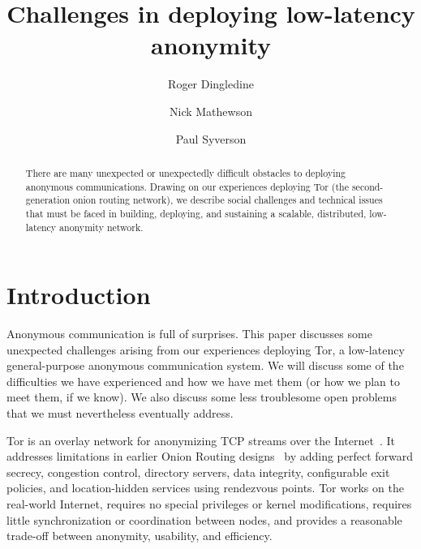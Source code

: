 \documentclass{llncs}
\begin{document}
\title{Challenges in deploying low-latency anonymity}

\author{Roger Dingledine \and
Nick Mathewson \and
Paul Syverson}

\maketitle
\pagestyle{plain}

\begin{abstract}
  There are many unexpected or unexpectedly difficult obstacles to
  deploying anonymous communications.  Drawing on our experiences deploying
  Tor (the second-generation onion routing network), we describe social
  challenges and technical issues that must be faced
  in building, deploying, and sustaining a scalable, distributed, low-latency
  anonymity network.
\end{abstract}

\section{Introduction}
Anonymous communication is full of surprises.  This paper discusses some
unexpected challenges arising from our experiences deploying Tor, a
low-latency general-purpose anonymous communication system.  We will discuss
some of the difficulties we have experienced and how we have met them (or how
we plan to meet them, if we know).  We also discuss some less
troublesome open problems that we must nevertheless eventually address.

Tor is an overlay network for anonymizing TCP streams over the
Internet~\cite{tor-design}.  It addresses limitations in earlier Onion
Routing designs~\cite{or-ih96,or-jsac98,or-discex00,or-pet00} by adding
perfect forward secrecy, congestion control, directory servers, data
integrity, configurable exit policies, and location-hidden services using
rendezvous points.  Tor works on the real-world Internet, requires no special
privileges or kernel modifications, requires little synchronization or
coordination between nodes, and provides a reasonable trade-off between
anonymity, usability, and efficiency.
\end{document}
